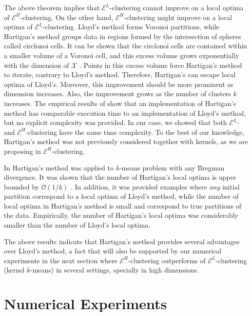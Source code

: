 \documentclass[aps,preprint,nofootinbib,floatfix]{revtex4-1}
\begin{document}
The above theorem implies that $\mathcal{E}^L$-clustering  cannot
improve on a local optima of $\mathcal{E}^H$-clustering. On the other hand,
$\mathcal{E}^H$-clustering might improve on a local optima of 
$\mathcal{E}^L$-clustering. Lloyd's method forms Voronoi partitions,
while Hartigan's method groups data
in regions formed by the intersection of spheres called circlonoi cells.
It can be shown that the circlonoi cells are contained within
a smaller volume of a Voronoi cell, and this excess volume grows
exponentially with the dimension of $\mathcal{X}$ 
\cite[Theorems 2.4 and 3.1]{Telgarsky}. 
Points in this excess volume
force Hartigan's method to iterate, contrary
to Lloyd's method. Therefore, Hartigan's 
can escape local
optima of Lloyd's. 
Moreover, this improvement should be more prominent as
dimension increases. Also, the improvement grows as the number of clusters
$k$ increases.
The empirical results of \cite{Telgarsky} show that 
an implementation of Hartigan's method has comparable execution time 
to an implementation of
Lloyd's method,
but no explicit complexity was provided. In our case, we showed that both
$\mathcal{E}^L$- and $\mathcal{E}^H$-clustering
have the same time complexity. To the best of our knowledge, Hartigan's
method was not previously considered together with kernels, as we 
are proposing
in $\mathcal{E}^{H}$-clustering.

In \cite{Slonin} Hartigan's method was applied to $k$-means problem
with any Bregman divergence. It was shown that the number of Hartigan's
local optima is upper bounded by $\mathcal{O}(1/k)$ 
\cite[Proposition 5.1]{Slonin}. 
In addition, it was provided examples where
\emph{any} initial partition correspond to a local optima of Lloyd's 
method, while  the number of local optima in Hartigan's method is small and 
correspond to true partitions of the data. Empirically, the number of
Hartigan's local optima was considerably smaller than the number of Lloyd's
local optima.

The above results indicate that Hartigan's method
provides several advantages over Lloyd's method, a fact that will also
be supported by our numerical experiments in the next section where 
$\mathcal{E}^H$-clustering  outperforms
of $\mathcal{E}^L$-clustering (kernel $k$-means) in several settings,
specially in high dimensions.


\section{Numerical Experiments}
\label{sec:numerics}
\end{document}
